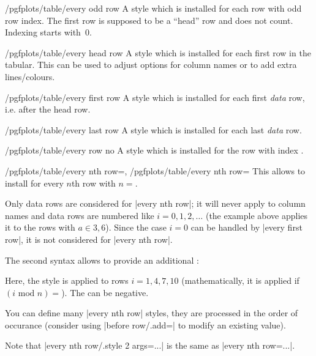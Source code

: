 \begin{stylekey}{/pgfplots/table/every odd row}	
	A style which is installed for each row with odd row index. The first row is supposed to be a ``head'' row and does not count. Indexing starts with~$0$.
\end{stylekey}

\begin{stylekey}{/pgfplots/table/every head row}	
	A style which is installed for each first row in the tabular. This can be used to adjust options for column names or to add extra lines/colours.
\end{stylekey}

\begin{stylekey}{/pgfplots/table/every first row}	
	A style which is installed for each first \emph{data} row, i.e. after the head row.
\end{stylekey}

\begin{stylekey}{/pgfplots/table/every last row}	
	A style which is installed for each last \emph{data} row.
\end{stylekey}

\begin{stylekey}{/pgfplots/table/every row no }	
	A style which is installed for the row with index .
\end{stylekey}

\begin{keylist}{%
	/pgfplots/table/every nth row=,
	/pgfplots/table/every nth row=}
	This allows to install  for every $n$th row with $n=$. 
\begin{codeexample}[]
\end{codeexample}
	Only data rows are considered for |every nth row|; it will never apply to column names and data rows are numbered like $i=0,1,2,\dotsc$ (the example above applies it to the rows with $a\in {3,6}$). Since the case $i=0$ can be handled by |every first row|, it is not considered for |every nth row|.

	The second syntax allows to provide an additional :
\begin{codeexample}[]
\end{codeexample}
	\noindent Here, the style is applied to rows $i=1,4,7,10$ (mathematically, it is applied if $(i \text{ mod } n) = $). The  can be negative.
	
	You can define many |every nth row| styles, they are processed in the order of occurance (consider using |before row/.add=| to modify an existing value).

	Note that |every nth row/.style 2 args=...| is the same as |every nth row=...|.
\end{keylist}

